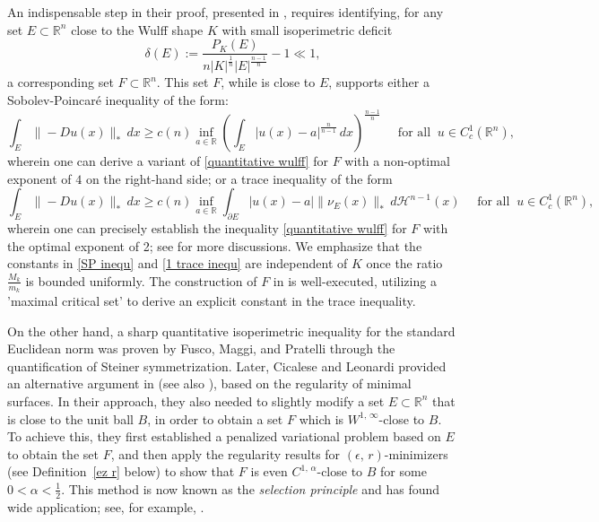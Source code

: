 \documentclass[reqno,11pt]{amsart}
\def\az{\alpha}
\def\ez{\epsilon}
\numberwithin{equation}{section}
\theoremstyle{remark}
\begin{document}
 
An indispensable step in their proof,  presented in \cite[Theorem 3.4]{FMP2010}, requires identifying, for any set $E\subset \mathbb R^n$ close to the Wulff shape $K$ with small isoperimetric deficit
$$\delta(E):=\frac{P_K(E)}{n|K|^{\frac{1}{n}}|E|^{\frac{n-1}{n}}}-1\ll 1,$$
a corresponding set $F\subset \mathbb R^n$. This set $F$, while is close to $E$, supports either a Sobolev-Poincar\'e inequality of the form:
\begin{equation}\label{SP inequ}
\int_{E} \|-Du(x)\|_* \,dx \ge c(n) \inf_{a\in \mathbb R} \left(\int_{E} |u(x)-a|^{\frac n{n-1}}\, dx\right)^{\frac {n-1} {n}} \quad \text{ for all } \ u\in C_c^1(\mathbb R^n),
\end{equation}
wherein one  can derive a variant of \eqref{quantitative wulff} for $F$ with a non-optimal exponent of $4$ on the right-hand side; or a trace inequality of the form
\begin{equation}\label{1 trace inequ}
\int_{E} \|-Du(x)\|_* \,dx \ge c(n) \inf_{a\in \mathbb R} \int_{\partial E} |u(x)-a|\|\nu_E(x)\|_*\, d\mathcal H^{n-1}(x) \quad \text{ for all } \ u\in C_c^1(\mathbb R^n),
\end{equation}
wherein one can precisely establish the inequality \eqref{quantitative wulff} for $F$ with the optimal exponent of 2; see \cite[Section 1.6]{FMP2010} for more discussions.
We emphasize that the constants in \eqref{SP inequ} and \eqref{1 trace inequ} are independent of $K$ once the ratio $\frac{M_k}{m_k}$ is bounded uniformly. 
The  construction of $F$ in \cite{FMP2010} is well-executed, utilizing a 'maximal critical set' to derive an explicit constant in the trace inequality.


On the other hand, a sharp quantitative isoperimetric inequality for the standard Euclidean norm was proven by Fusco, Maggi, and Pratelli \cite{FMP2008} through the quantification of Steiner symmetrization. Later, Cicalese and Leonardi provided an alternative argument in \cite{CL2012} (see also \cite{AFM2013}), based on the regularity of minimal surfaces. In their approach, they also needed to slightly modify a set   $E\subset \mathbb R^n$ that is close to the unit ball $B$,  in order to obtain a set $F$ which is $W^{1,\,\infty}$-close to $B$.  To achieve this, they first established a penalized variational problem based on $E$ to obtain the set $F$, and then apply the regularity results for $(\ez,\,r)$-minimizers (see Definition~\ref{ez r} below) to show that $F$ is even $C^{1,\,\az}$-close to $B$ for some $0<\az<\frac 1 2$. 
This method is now known as the \emph{selection principle} and has found wide application; see, for example, \cite{BDV2015, FZ2017, FZ2022}.
\end{document}
